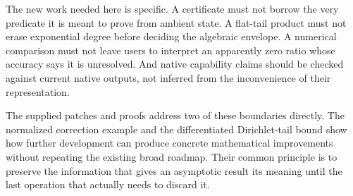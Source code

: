 \documentclass[11pt,letterpaper]{article}
\begin{document}
The new work needed here is specific. A certificate must not borrow the very
predicate it is meant to prove from ambient state. A flat-tail product must not
erase exponential degree before deciding the algebraic envelope. A numerical
comparison must not leave users to interpret an apparently zero ratio whose
accuracy says it is unresolved. And native capability claims should be checked
against current native outputs, not inferred from the inconvenience of their
representation.

The supplied patches and proofs address two of these boundaries directly.
The normalized correction example and the differentiated Dirichlet-tail bound
show how further development can produce concrete mathematical improvements
without repeating the existing broad roadmap. Their common principle is to
preserve the information that gives an asymptotic result its meaning until the
last operation that actually needs to discard it.

\appendix
\end{document}
